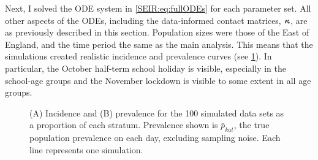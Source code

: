 \documentclass[thesis.tex]{subfiles}
\begin{document}
Next, I solved the ODE system in \cref{SEIR:eq:fullODEs} for each parameter set.
All other aspects of the ODEs, including the data-informed contact matrices, $\bm{\kappa}$, are as previously described in this section.
Population sizes were those of the East of England, and the time period the same as the main analysis.
This means that the simulations created realistic incidence and prevalence curves (see \cref{SEIR:fig:sim-data}).
In particular, the October half-term school holiday is visible, especially in the school-age groups and the November lockdown is visible to some extent in all age groups.
\begin{figure}
    \vspace{-3cm}
    \caption[Simulated data]{%
        (A) Incidence and (B) prevalence for the 100 simulated data sets as a proportion of each stratum.
        Prevalence shown is $\bar{p}_{kat}$, the true population prevalence on each day, excluding sampling noise.
        Each line represents one simulation.
    }
    \label{SEIR:fig:sim-data}
\end{figure}
\end{document}

